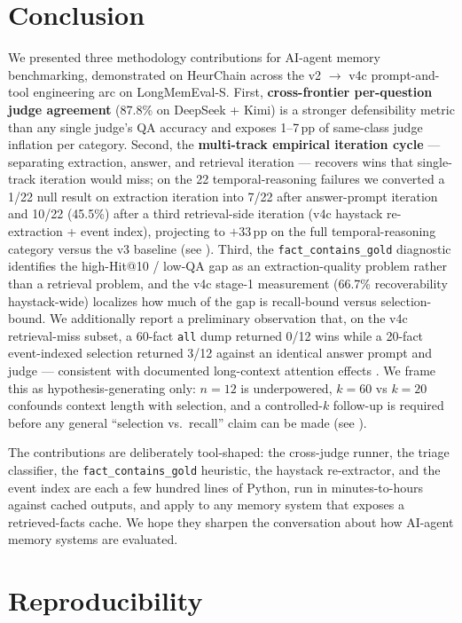 \documentclass{article}
\begin{document}
\section{Conclusion}
\label{sec:conclusion}

We presented three methodology contributions for AI-agent memory benchmarking, demonstrated on HeurChain across the v2 $\to$ v4c prompt-and-tool engineering arc on LongMemEval-S. First, \textbf{cross-frontier per-question judge agreement} (87.8\% on DeepSeek + Kimi) is a stronger defensibility metric than any single judge's QA accuracy and exposes 1--7\,pp of same-class judge inflation per category. Second, the \textbf{multi-track empirical iteration cycle} --- separating extraction, answer, and retrieval iteration --- recovers wins that single-track iteration would miss; on the 22 temporal-reasoning failures we converted a 1/22 null result on extraction iteration into 7/22 after answer-prompt iteration and 10/22 (45.5\%) after a third retrieval-side iteration (v4c haystack re-extraction + event index), projecting to $+33$\,pp on the full temporal-reasoning category versus the v3 baseline (see ). Third, the \texttt{fact\_contains\_gold} diagnostic identifies the high-Hit@10 / low-QA gap as an extraction-quality problem rather than a retrieval problem, and the v4c stage-1 measurement (66.7\% recoverability haystack-wide) localizes how much of the gap is recall-bound versus selection-bound. We additionally report a preliminary observation that, on the v4c retrieval-miss subset, a 60-fact \texttt{all} dump returned 0/12 wins while a 20-fact event-indexed selection returned 3/12 against an identical answer prompt and judge --- consistent with documented long-context attention effects \citep{liu2024lost}. We frame this as hypothesis-generating only: $n=12$ is underpowered, $k=60$ vs $k=20$ confounds context length with selection, and a controlled-$k$ follow-up is required before any general ``selection vs.\ recall'' claim can be made (see ).

The contributions are deliberately tool-shaped: the cross-judge runner, the triage classifier, the \texttt{fact\_contains\_gold} heuristic, the haystack re-extractor, and the event index are each a few hundred lines of Python, run in minutes-to-hours against cached outputs, and apply to any memory system that exposes a retrieved-facts cache. We hope they sharpen the conversation about how AI-agent memory systems are evaluated.

\section{Reproducibility}
\label{sec:repro}
\end{document}
